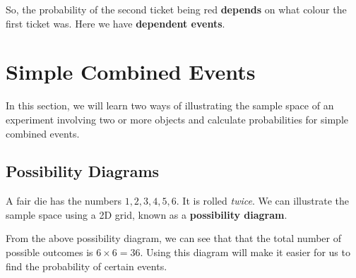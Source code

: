 \documentclass[11pt,a4paper]{book}
\begin{document}
So, the probability of the second ticket being red \textbf{depends}
on what colour the first ticket was. Here we have \textbf{dependent
events}.

\medskip


\newpage

\section{Simple Combined Events}

In this section, we will learn two ways of illustrating the sample
space of an experiment involving two or more objects and calculate
probabilities for simple combined events.

\subsection{Possibility Diagrams}

A fair die has the numbers $1,2,3,4,5,6$. It is rolled \textit{twice}.
We can illustrate the sample space using a 2D grid, known as a \textbf{possibility
diagram}.

\begin{center}
\end{center}

From the above possibility diagram, we can see that that the total
number of possible outcomes is $6\times6=36$. Using this diagram
will make it easier for us to find the probability of certain events.
\end{document}
